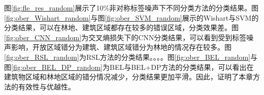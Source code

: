 图\ref{fig:fle_res_random}展示了10\%非对称标签噪声下不同分类方法的分类结果。图\ref{fig:ober_Wishart_random}与图\ref{fig:ober_SVM_random}展示的Wishart与SVM的分类结果，可以在林地、建筑区域都存在较多的错误区域，分类效果差。图\ref{fig:ober_CNN_random}为交叉熵损失下的CNN分类结果，可以看到受到标签噪声影响，开放区域错分为建筑、建筑区域错分为林地的情况存在较多。图\ref{fig:ober_RSL_random}为RSL方法的分类结果。。。。图\ref{fig:ober_BEL_random}与图\ref{fig:ober_BEL_DP_random}为BEL与BEL+DP方法的分类结果，可以看出在建筑物区域和林地区域的错分情况减少，分类结果更加平滑。因此，证明了本章方法的有效性与优越性。
\begin{figure}[ht!]


\end{figure}
